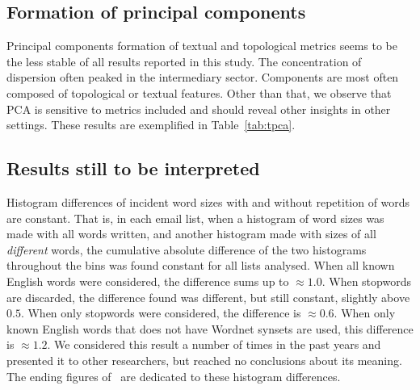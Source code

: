 \subsection{Formation of principal components}\label{subsec:pc}
% 
Principal components formation of textual and topological metrics
seems to be the less stable of all results reported in this study.
The concentration of dispersion often peaked in the intermediary sector.
Components are most often composed of topological or textual features.
Other than that, we observe that PCA is sensitive to metrics included
and should reveal other insights in other settings.
These results are exemplified in Table~\ref{tab:tpca}.


\subsection{Results still to be interpreted}\label{subsec:sii}
Histogram differences of incident word sizes with and without repetition of words are constant.
That is, in each email list, when a histogram of word sizes was made with all words written, and another histogram made with sizes of all \emph{different} words, the cumulative absolute difference of the two histograms throughout the bins was found constant for all lists analysed.
When all known English words were considered, 
the difference sums up to $\approx 1.0$.
When stopwords are discarded,
the difference found was different, but still constant, slightly above $0.5$.
When only stopwords were considered, the difference is $\approx 0.6$.
When only known English words that does not have Wordnet synsets are used,
this difference is $\approx 1.2$.
We considered this result a number of times in the past years and presented it to other researchers,
but reached no conclusions about its meaning.
The ending figures of~\cite{textTables} are dedicated to these histogram differences.

